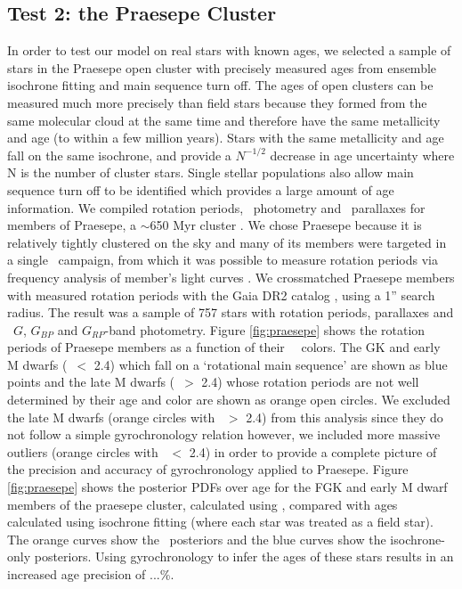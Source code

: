 \subsection{Test 2: the Praesepe Cluster}
In order to test our model on real stars with known ages, we selected a sample
of stars in the Praesepe open cluster with precisely measured ages from
ensemble isochrone fitting and main sequence turn off.
The ages of open clusters can be measured much more precisely than field stars
because they formed from the same molecular cloud at the same time and
therefore have the same metallicity and age (to within a few million years).
Stars with the same metallicity and age fall on the same isochrone, and
provide a $N^{-1/2}$ decrease in age uncertainty where N is the number of
cluster stars.
Single stellar populations also allow main sequence turn off to be identified
which provides a large amount of age information.
We compiled rotation periods, \Gaia\ photometry and \gaia\ parallaxes for
members of Praesepe, a $\sim$650 Myr cluster \citep{fossati2008}.
We chose Praesepe because it is relatively tightly clustered on the sky and
many of its members were targeted in a single \ktwo\ campaign, from which it
was possible to measure rotation periods via frequency analysis of member's
light curves \citep{douglas2017}.
We crossmatched Praesepe members with measured rotation periods
\citep{douglas2017} with the Gaia DR2 catalog \citep{brown2018}, using a 1''
search radius.
The result was a sample of 757 stars with rotation periods, parallaxes and
\gaia\ $G$, $G_{BP}$ and $G_{RP}$-band photometry.
Figure \ref{fig:praesepe} shows the rotation periods of Praesepe members as
a function of their \gaia\ \gcolor\ colors.
The GK and early M dwarfs (\gcolor\ $<$ 2.4) which fall on a `rotational main
sequence' are shown as blue points and the late M dwarfs (\gcolor\ $>$ 2.4)
whose rotation periods are not well determined by their age and color are
shown as orange open circles.
We excluded the late M dwarfs (orange circles with \gcolor\ $>$ 2.4) from this
analysis since they do not follow a simple gyrochronology relation however, we
included more massive outliers (orange circles with \gcolor\ $<$ 2.4) in order
to provide a complete picture of the precision and accuracy of gyrochronology
applied to Praesepe.
Figure \ref{fig:praesepe} shows the posterior PDFs over age for the FGK and
early M dwarf members of the praesepe cluster, calculated using \sd, compared
with ages calculated using isochrone fitting (where each star was treated as a
field star).
The orange curves show the \sd\ posteriors and the blue curves show the
isochrone-only posteriors.
Using gyrochronology to infer the ages of these stars results in an increased
age precision of ...\%.

